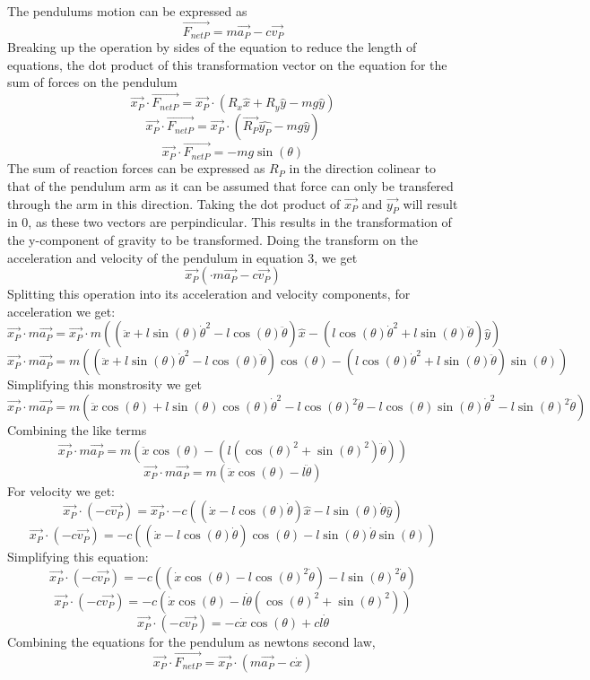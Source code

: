 \documentclass{article}
\begin{document}
The pendulums motion can be expressed as 
\[\vec{F_{netP}}=m\vec{a_P}-c\vec{v_P}\]
Breaking up the operation by sides of the equation to reduce the length of equations, the dot product of this transformation vector 
on the equation for the sum of forces on the pendulum
\[\vec{x_P}\cdot\vec{F_{netP}}=\vec{x_P}\cdot(R_x\hat{x}+R_y\hat{y}-mg\hat{y})\]
\[\vec{x_P}\cdot\vec{F_{netP}}=\vec{x_P}\cdot(\vec{R_P}\hat{y_P}-mg\hat{y})\]
\[\vec{x_P}\cdot\vec{F_{netP}}=-mg\sin(\theta)\]
The sum of reaction forces can be expressed as $R_P$ in the direction colinear to that 
of the pendulum arm as it can be assumed that force can only be transfered through the arm 
in this direction. Taking the dot product of $\vec{x_P}$ and $\vec{y_P}$ will result in 0, as 
these two vectors are perpindicular. This results in the transformation of the y-component of gravity
to be transformed. Doing the transform on the acceleration and velocity of the pendulum in equation 3, we get
\[\vec{x_P}(\cdot m \vec{a_P}-c\vec{v_P})\]
Splitting this operation into its acceleration and velocity components, for acceleration we get:
\[\vec{x_P}\cdot m \vec{a_P}=\vec{x_P}\cdot m((\ddot{x}+l\sin(\theta)\dot{\theta}^2-l\cos(\theta)\ddot{\theta})\hat{x}-(l\cos(\theta)\dot{\theta}^2+l\sin(\theta)\ddot{\theta})\hat{y})\]
\[\vec{x_P}\cdot m \vec{a_P}=m((\ddot{x}+l\sin(\theta)\dot{\theta}^2-l\cos(\theta)\ddot{\theta})\cos(\theta)-(l\cos(\theta)\dot{\theta}^2+l\sin(\theta)\ddot{\theta})\sin(\theta))\]
Simplifying this monstrosity we get
\[\vec{x_P}\cdot m \vec{a_P}=m(\ddot{x}\cos(\theta)+l\sin(\theta)\cos(\theta)\dot{\theta}^2-l\cos(\theta)^2\ddot{\theta}-l\cos(\theta)\sin(\theta)\dot{\theta}^2-l\sin(\theta)^2\ddot{\theta})\]
Combining the like terms 
\[\vec{x_P}\cdot m \vec{a_P}=m(\ddot{x}\cos(\theta)-(l(\cos(\theta)^2+\sin(\theta)^2)\ddot{\theta}))\]
\[\vec{x_P}\cdot m \vec{a_P}=m(\ddot{x}\cos(\theta)-l\ddot{\theta})\]
For velocity we get:
\[\vec{x_P}\cdot (-c\vec{v_P})=\vec{x_P}\cdot -c((\dot{x}-l\cos(\theta)\dot{\theta})\hat{x}-l\sin(\theta)\dot{\theta}\hat{y})\]
\[\vec{x_P}\cdot (-c\vec{v_P})=-c((\dot{x}-l\cos(\theta)\dot{\theta})\cos{(\theta)}-l\sin(\theta)\dot{\theta}\sin{(\theta)})\]
Simplifying this equation:
\[\vec{x_P}\cdot (-c\vec{v_P})=-c((\dot{x}\cos{(\theta)}-l\cos{(\theta)}^2\dot{\theta})-l\sin{(\theta)}^2\dot{\theta})\]
\[\vec{x_P}\cdot (-c\vec{v_P})=-c(\dot{x}\cos{(\theta)}-l\dot{\theta}(\cos{(\theta)}^2+\sin{(\theta)}^2))\]
\[\vec{x_P}\cdot (-c\vec{v_P})=-c\dot{x}\cos{(\theta)}+cl\dot{\theta}\]
Combining the equations for the pendulum as newtons second law,
\[\vec{x_P}\cdot\vec{F_{netP}}=\vec{x_P}\cdot (m\vec{a_P}-c\dot{x})\]
\end{document}
